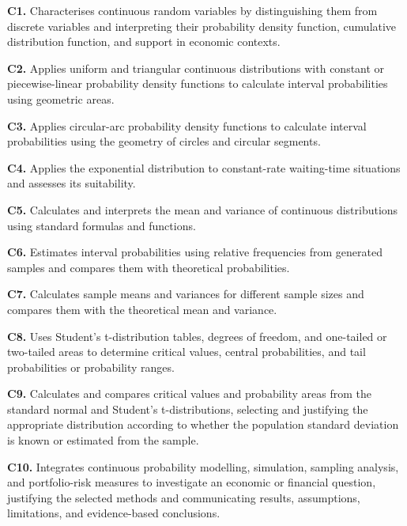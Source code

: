 \documentclass[10pt,letterpaper]{article}
\newcommand{\criterion}[2]{\textbf{C#1.} #2\par}
\begin{document}
\begin{minipage}[t]{0.64\textwidth}
    \begin{bluebox}
        \fontsize{7.75}{9.85}\selectfont
        \criterion{1}{Characterises continuous random variables by distinguishing them from discrete variables and interpreting their probability density function, cumulative distribution function, and support in economic contexts.}
        \criterion{2}{Applies uniform and triangular continuous distributions with constant or piecewise-linear probability density functions to calculate interval probabilities using geometric areas.}
        \criterion{3}{Applies circular-arc probability density functions to calculate interval probabilities using the geometry of circles and circular segments.}
        \criterion{4}{Applies the exponential distribution to constant-rate waiting-time situations and assesses its suitability.}
        \criterion{5}{Calculates and interprets the mean and variance of continuous distributions using standard formulas and functions.}
        \criterion{6}{Estimates interval probabilities using relative frequencies from generated samples and compares them with theoretical probabilities.}
        \criterion{7}{Calculates sample means and variances for different sample sizes and compares them with the theoretical mean and variance.}
        \criterion{8}{Uses Student's t-distribution tables, degrees of freedom, and one-tailed or two-tailed areas to determine critical values, central probabilities, and tail probabilities or probability ranges.}
        \criterion{9}{Calculates and compares critical values and probability areas from the standard normal and Student's t-distributions, selecting and justifying the appropriate distribution according to whether the population standard deviation is known or estimated from the sample.}
        \criterion{10}{Integrates continuous probability modelling, simulation, sampling analysis, and portfolio-risk measures to investigate an economic or financial question, justifying the selected methods and communicating results, assumptions, limitations, and evidence-based conclusions.}
    \end{bluebox}
\end{minipage}

\newpage
\end{document}
